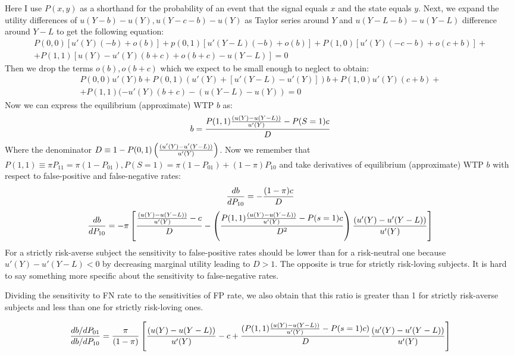 \documentclass[12pt,a4paper]{article}
\begin{document}
Here I use $P(x,y)$ as a shorthand for the probability of an event that the signal equals $x$ and the state equals $y$. Next, we expand the utility differences of $u(Y-b)-u(Y), u(Y-c-b)-u(Y)$ as Taylor series around $Y$ and $u(Y-L-b)-u(Y-L)$ difference around $Y-L$ to get the following equation:\begin{equation}
\begin{split}
P(0,0) [u'(Y)(-b)+o(b)]+p(0,1)[u'(Y-L)(-b)+o(b)]+P(1,0)[u'(Y)(-c-b)+o(c+b)]+\\+P(1,1)[u(Y)-u'(Y)(b+c)+o(b+c)-u(Y-L)]=0
\end{split}
\end{equation}
Then we drop the terms $o(b), o(b+c)$ which we expect to be small enough to neglect to obtain:
\begin{equation}
\begin{split}
P(0,0)u'(Y)b+P(0,1)(u'(Y)+[u'(Y-L)-u'(Y)])b+P(1,0)u'(Y)(c+b)+\\+P(1,1)(-u'(Y)(b+c)-(u(Y-L)-u(Y))=0
\end{split}
\end{equation}
Now we can express the equilibrium (approximate) WTP $b$ as:
\[b={ P(1,1){(u(Y)-u(Y-L)) \over u'(Y)}-P(S=1)c \over D} \]
Where the denominator $D\equiv 1-P(0,1)\left({(u'(Y)-u'(Y-L))\over u'(Y)}\right)$. Now we remember that $P(1,1) \equiv \pi P_{11}=\pi (1-P_{01}), P(S=1)=\pi (1-P_{01})+(1-\pi)P_{10}$ and take derivatives of equilibrium (approximate) WTP $b$ with respect to false-positive and false-negative rates:
\[{db \over dP_{10}}=-{(1-\pi)c \over D} \]
\[{db \over dP_{10}}=-\pi \left[ {{(u(Y)-u(Y-L)) \over u'(Y)}-c \over D}-\left({P(1,1){(u(Y)-u(Y-L)) \over u'(Y)}-P(s=1)c \over D^2}\right) {(u'(Y)-u'(Y-L))\over u'(Y)} \right] \]
For a strictly risk-averse subject the sensitivity to false-positive rates should be lower than for a risk-neutral one because $u'(Y)-u'(Y-L)<0$ by decreasing marginal utility leading to $D>1$. The opposite is true for strictly risk-loving subjects. It is hard to say something more specific about the sensitivity to false-negative rates. 

Dividing the sensitivity to FN rate to the sensitivities of FP rate, we also obtain that this ratio is greater than 1 for strictly risk-averse subjects and less than one for strictly risk-loving ones. 

\[{db/dP_{01} \over db/dP_{10}}={\pi \over (1-\pi)} \left[{(u(Y)-u(Y-L)) \over u'(Y)}-c +{(P(1,1){(u(Y)-u(Y-L)) \over u'(Y)}-P(s=1)c) \over D}{(u'(Y)-u'(Y-L))\over u'(Y)}  \right] \]
\end{document}
